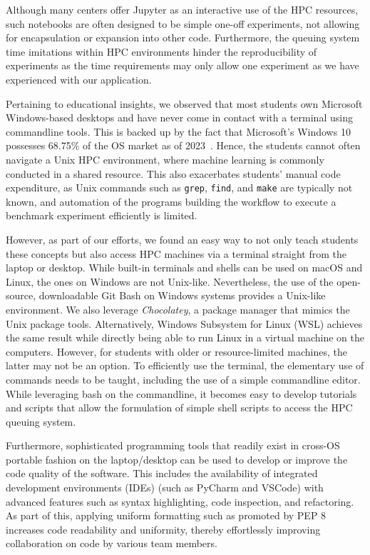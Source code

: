\documentclass[utf8]{FrontiersinVancouver} %
\begin{document}
Although many centers offer Jupyter as an interactive use of the HPC resources, such notebooks are often designed to be simple one-off experiments, not allowing for encapsulation or expansion into other code. Furthermore, the queuing system time imitations within HPC environments hinder the reproducibility of experiments as the time requirements may only allow one experiment as we have experienced with our application.

Pertaining to educational insights, we observed that most students own Microsoft Windows-based desktops and have never come in contact with a terminal using commandline tools. This is backed up by the fact that Microsoft's Windows 10 possesses 68.75\% of the OS market as of 2023~\cite{norem}. Hence, the students cannot often navigate a Unix HPC environment, where machine learning is commonly conducted in a shared resource. This also exacerbates students' manual code expenditure, as Unix commands such as \verb|grep|, \verb|find|, and \verb|make| are typically not known, and automation of the programs building the workflow to execute a benchmark experiment efficiently is limited. 

However, as part of our efforts, we found an easy way to not only teach students these concepts but also access HPC machines via a terminal straight from the laptop or desktop. While built-in terminals and shells can be used on macOS and Linux, the ones on Windows are not Unix-like. Nevertheless, the use of the open-source, downloadable Git Bash on Windows systems provides a Unix-like environment. We also leverage {\em Chocolatey}, a package manager that mimics the Unix package tools. Alternatively, Windows Subsystem for Linux (WSL) achieves the same result while directly being able to run Linux in a virtual machine on the computers. However, for students with older or resource-limited machines, the latter may not be an option. 
To efficiently use the terminal, the elementary use of commands needs to be taught, including the use of a simple commandline editor. While leveraging bash on the commandline, it becomes easy to develop tutorials and scripts that allow the formulation of simple shell scripts to access the HPC queuing system. 

Furthermore, sophisticated programming tools that readily exist in cross-OS portable fashion on the laptop/desktop can be used to develop or improve the code quality of the software. This includes the availability of integrated development environments (IDEs) (such as PyCharm and VSCode) with advanced features such as syntax highlighting, code inspection, and refactoring.  As part of this, applying uniform formatting such as promoted by PEP 8 \cite{www-pep8} increases code readability and uniformity, thereby effortlessly improving collaboration on code by various team members.
\end{document}

